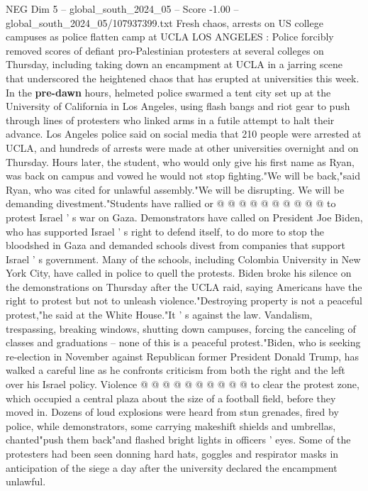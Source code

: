 \begin{textsample}{NEG Dim 5 – global\_south\_2024\_05 – Score -1.00 – global\_south\_2024\_05/107937399.txt}  \label{ex:f5_neg_322}
Fresh chaos, arrests on US college campuses as police flatten camp at UCLA LOS ANGELES : Police forcibly removed scores of defiant pro-Palestinian protesters at several colleges on Thursday, including taking down an encampment at UCLA in a jarring scene that underscored the heightened chaos that has erupted at universities this week.
In the \textbf{pre-dawn} hours, helmeted police swarmed a tent city set up at the University of California in Los Angeles, using flash bangs and riot gear to push through lines of protesters who linked arms in a futile attempt to halt their advance.
Los Angeles police said on social media that 210 people were arrested at UCLA, and hundreds of arrests were made at other universities overnight and on Thursday.
Hours later, the student, who would only give his first name as Ryan, was back on campus and vowed he would not stop fighting."We will be back,"said Ryan, who was cited for unlawful assembly."We will be disrupting.
We will be demanding divestment."Students have rallied or @ @ @ @ @ @ @ @ @ @ to protest Israel ' s war on Gaza.
Demonstrators have called on President Joe Biden, who has supported Israel ' s right to defend itself, to do more to stop the bloodshed in Gaza and demanded schools divest from companies that support Israel ' s government.
Many of the schools, including Colombia University in New York City, have called in police to quell the protests.
Biden broke his silence on the demonstrations on Thursday after the UCLA raid, saying Americans have the right to protest but not to unleash violence."Destroying property is not a peaceful protest,"he said at the White House."It ' s against the law.
Vandalism, trespassing, breaking windows, shutting down campuses, forcing the canceling of classes and graduations -- none of this is a peaceful protest."Biden, who is seeking re-election in November against Republican former President Donald Trump, has walked a careful line as he confronts criticism from both the right and the left over his Israel policy.
Violence @ @ @ @ @ @ @ @ @ @ to clear the protest zone, which occupied a central plaza about the size of a football field, before they moved in.
Dozens of loud explosions were heard from stun grenades, fired by police, while demonstrators, some carrying makeshift shields and umbrellas, chanted"push them back"and flashed bright lights in officers ' eyes.
Some of the protesters had been seen donning hard hats, goggles and respirator masks in anticipation of the siege a day after the university declared the encampment unlawful.

\end{textsample}
